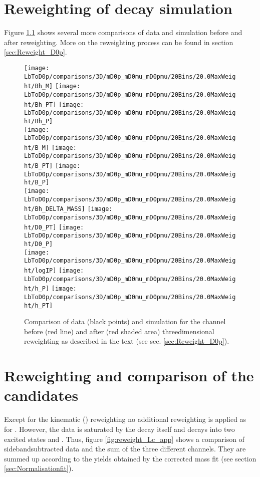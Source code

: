\chapter{Reweighting of \LbToDpmunuX decay simulation}
\label{app:Reweight_D0p}
Figure \ref{fig:reweight_D0p_app} shows several more comparisons of data and simulation before and after reweighting.
More on the reweighting process can be found in section \ref{sec:Reweight_D0p}.
\begin{figure}[tb]
    \centering
	\texttt{[image: LbToD0p/comparisons/3D/mD0p\_mD0mu\_mD0pmu/20Bins/20.0MaxWeight/Bh\_M]}
	\texttt{[image: LbToD0p/comparisons/3D/mD0p\_mD0mu\_mD0pmu/20Bins/20.0MaxWeight/Bh\_PT]}
	\texttt{[image: LbToD0p/comparisons/3D/mD0p\_mD0mu\_mD0pmu/20Bins/20.0MaxWeight/Bh\_P]}          \\
	\texttt{[image: LbToD0p/comparisons/3D/mD0p\_mD0mu\_mD0pmu/20Bins/20.0MaxWeight/B\_M]}           
	\texttt{[image: LbToD0p/comparisons/3D/mD0p\_mD0mu\_mD0pmu/20Bins/20.0MaxWeight/B\_PT]}
	\texttt{[image: LbToD0p/comparisons/3D/mD0p\_mD0mu\_mD0pmu/20Bins/20.0MaxWeight/B\_P]}           \\
    \texttt{[image: LbToD0p/comparisons/3D/mD0p\_mD0mu\_mD0pmu/20Bins/20.0MaxWeight/Bh\_DELTA\_MASS]}
	\texttt{[image: LbToD0p/comparisons/3D/mD0p\_mD0mu\_mD0pmu/20Bins/20.0MaxWeight/D0\_PT]}
	\texttt{[image: LbToD0p/comparisons/3D/mD0p\_mD0mu\_mD0pmu/20Bins/20.0MaxWeight/D0\_P]}          \\
    \texttt{[image: LbToD0p/comparisons/3D/mD0p\_mD0mu\_mD0pmu/20Bins/20.0MaxWeight/logIP]}
	\texttt{[image: LbToD0p/comparisons/3D/mD0p\_mD0mu\_mD0pmu/20Bins/20.0MaxWeight/h\_P]}
	\texttt{[image: LbToD0p/comparisons/3D/mD0p\_mD0mu\_mD0pmu/20Bins/20.0MaxWeight/h\_PT]}
	\caption{Comparison of data (black points) and simulation for the \LbToDpmunuX channel before (red line) and after (red shaded area) threedimensional reweighting as described in the text (see sec. \ref{sec:Reweight_D0p}).}
    \label{fig:reweight_D0p_app}
\end{figure}

\chapter{Reweighting and comparison of the \LbToLcmunu candidates}
\label{app:Reweight_Lc}
Except for the kinematic \pt(\Lb) reweighting no additional reweighting is applied as for \LbToDpmunu. 
However, the data is saturated by the decay \LbToLcmunu itself and decays into two excited states  and . 
Thus, figure \ref{fig:reweight_Lc_app} shows a comparison of sidebandsubtracted data and the sum of the three different channels.
They are summed up according to the yields obtained by the corrected mass fit (see section \ref{sec:Normalisationfit}).

